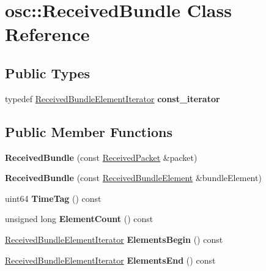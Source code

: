 \hypertarget{classosc_1_1_received_bundle}{}\section{osc\+:\+:Received\+Bundle Class Reference}
\label{classosc_1_1_received_bundle}
\subsection*{Public Types}
\begin{DoxyCompactItemize}
\item 
\mbox{\label{classosc_1_1_received_bundle_a92d924e2159e12573aded48bb1af721f}} 
typedef \hyperlink{classosc_1_1_received_bundle_element_iterator}{Received\+Bundle\+Element\+Iterator} {\bfseries const\+\_\+iterator}
\end{DoxyCompactItemize}
\subsection*{Public Member Functions}
\begin{DoxyCompactItemize}
\item 
\mbox{\label{classosc_1_1_received_bundle_aa8c962985f4d813d924e670d35c0308a}} 
{\bfseries Received\+Bundle} (const \hyperlink{classosc_1_1_received_packet}{Received\+Packet} \&packet)
\item 
\mbox{\label{classosc_1_1_received_bundle_a5b84c6e3b273f7d57e6913d03e9ddfba}} 
{\bfseries Received\+Bundle} (const \hyperlink{classosc_1_1_received_bundle_element}{Received\+Bundle\+Element} \&bundle\+Element)
\item 
\mbox{\label{classosc_1_1_received_bundle_a3a3f2296aa23710f5b337919d421c1f8}} 
uint64 {\bfseries Time\+Tag} () const
\item 
\mbox{\label{classosc_1_1_received_bundle_a05fa4b39a6473a35806c25114bdb94d4}} 
unsigned long {\bfseries Element\+Count} () const
\item 
\mbox{\label{classosc_1_1_received_bundle_ac6069a27f2e105422fdab734cad33ae3}} 
\hyperlink{classosc_1_1_received_bundle_element_iterator}{Received\+Bundle\+Element\+Iterator} {\bfseries Elements\+Begin} () const
\item 
\mbox{\label{classosc_1_1_received_bundle_a813f6214aefbc93492b158d72aba26af}} 
\hyperlink{classosc_1_1_received_bundle_element_iterator}{Received\+Bundle\+Element\+Iterator} {\bfseries Elements\+End} () const
\end{DoxyCompactItemize}


